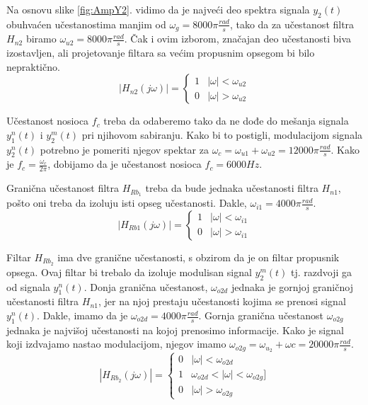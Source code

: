 \documentclass[titlepage,a4paper,12pt]{article}
\begin{document}
	\bigskip
	Na osnovu slike \ref{fig:AmpY2}. vidimo da je najveći deo spektra signala $y_2(t)$ obuhvaćen učestanostima manjim od $\omega_g = 8000\pi \frac{rad}{s}$,
	tako da za učestanost filtra $H_{n2}$ biramo $\omega_{u2} = 8000\pi \frac{rad}{s}$. Čak i ovim izborom, značajan deo učestanosti biva izostavljen, ali projetovanje filtara sa većim propusnim opsegom bi bilo nepraktično.
	\begin{equation}
		|H_{n2}(j\omega)| = \left\{
		\begin{array}{ll}
			1& |\omega| < \omega_{u2} \\
			0& |\omega| > \omega_{u2}
		\end{array}\right.
	\end{equation} 
	
	\bigskip
	Učestanost nosioca $f_c$ treba da odaberemo tako da ne dođe do mešanja signala $y_1^n(t)$ i $y_2^m(t)$ pri njihovom sabiranju. Kako bi to postigli, modulacijom signala $y_2^n(t)$ potrebno je pomeriti njegov spektar za $\omega_c = \omega_{u1} + \omega_{u2} = 12000\pi\frac{rad}{s}$. Kako je $f_c = \frac{\omega_c}{2\pi}$, dobijamo da je učestanost nosioca $f_c = 6000Hz$.
	
	\bigskip
	Granična učestanost filtra $H_{Rb_1}$ treba da bude jednaka učestanosti filtra  $H_{n1}$, pošto oni treba da izoluju isti opseg učestanosti. Dakle, $\omega_{i1} = 4000\pi \frac{rad}{s}$. 
	\begin{equation}
		|H_{Rb1}(j\omega)| = \left\{
		\begin{array}{ll}
			1& |\omega| < \omega_{i1} \\
			0& |\omega| > \omega_{i1}
		\end{array}\right.
	\end{equation} 
	
	\bigskip
	Filtar $H_{Rb_2}$ ima dve granične učestanosti, s obzirom da je on filtar propusnik opsega. Ovaj filtar bi trebalo da izoluje modulisan signal $y_2^m(t)$ tj. razdvoji ga od signala $y_1^n(t)$. Donja granična učestanost, $\omega_{o2d}$ jednaka je gornjoj graničnoj učestanosti filtra $H_{n1}$, jer na njoj prestaju učestanosti kojima se prenosi signal $y_1^n(t)$. Dakle, imamo da je	$\omega_{o2d} = 4000\pi \frac{rad}{s}$. Gornja granična učestanost  $\omega_{o2g}$ jednaka je najvišoj učestanosti na kojoj prenosimo informacije.  Kako je signal koji izdvajamo nastao modulacijom, njegov imamo $\omega_{o2g} =\omega_{u_2}+\omega{c} = 20000\pi \frac{rad}{s}$.
	\begin{equation}
		|H_{Rb_2}(j\omega)| = \left\{
		\begin{array}{ll}
			0& |\omega| < \omega_{o2d}\\
			1& \omega_{o2d} < |\omega| < \omega_{o2g}] \\
			0& |\omega| > \omega_{o2g}
		\end{array}\right.
	\end{equation} 
	
\end{document}
